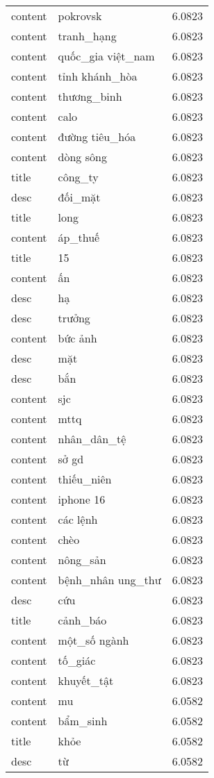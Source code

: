 \documentclass{article}
\begin{document}
\begin{tabular}{lll}
content & pokrovsk & 6.0823\\
content & tranh\_hạng & 6.0823\\
content & quốc\_gia việt\_nam & 6.0823\\
content & tỉnh khánh\_hòa & 6.0823\\
content & thương\_binh & 6.0823\\
content & calo & 6.0823\\
content & đường tiêu\_hóa & 6.0823\\
content & dòng sông & 6.0823\\
title & công\_ty & 6.0823\\
desc & đối\_mặt & 6.0823\\
title & long & 6.0823\\
content & áp\_thuế & 6.0823\\
title & 15 & 6.0823\\
content & ấn & 6.0823\\
desc & hạ & 6.0823\\
desc & trưởng & 6.0823\\
content & bức ảnh & 6.0823\\
desc & mặt & 6.0823\\
desc & bắn & 6.0823\\
content & sjc & 6.0823\\
content & mttq & 6.0823\\
content & nhân\_dân\_tệ & 6.0823\\
content & sở gd & 6.0823\\
content & thiếu\_niên & 6.0823\\
content & iphone 16 & 6.0823\\
content & các lệnh & 6.0823\\
content & chèo & 6.0823\\
content & nông\_sản & 6.0823\\
content & bệnh\_nhân ung\_thư & 6.0823\\
desc & cứu & 6.0823\\
title & cảnh\_báo & 6.0823\\
content & một\_số ngành & 6.0823\\
content & tố\_giác & 6.0823\\
content & khuyết\_tật & 6.0823\\
content & mu & 6.0582\\
content & bẩm\_sinh & 6.0582\\
title & khỏe & 6.0582\\
desc & từ & 6.0582\\

\end{tabular}
\end{document}
